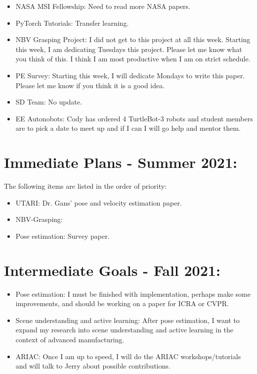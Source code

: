 \documentclass[11pt]{article}
\begin{document}
\begin{itemize}
      \item NASA MSI Fellowship: Need to read more NASA papers.
      \item PyTorch Tutorials: Transfer learning.
      \item NBV Grasping Project: I did not get to this project at all this week. Starting this week, I am dedicating Tuesdays this project. Please let me know what you think of this. I think I am most productive when I am on strict schedule.
      \item PE Survey: Starting this week, I will dedicate Mondays to write this paper. Please let me know if you think it is a good idea.
      \item SD Team: No update.
      \item EE Autonobots: Cody has ordered 4 TurtleBot-3 robots and student members are to pick a date to meet up and if I can I will go help and mentor them.
\end{itemize}


\section{Immediate Plans - Summer 2021:}
The following items are listed in the order of priority:

\begin{itemize}
      \item UTARI: Dr. Gans' pose and velocity estimation paper.
      \item NBV-Grasping:
      \item Pose estimation: Survey paper.
\end{itemize}

\section{Intermediate Goals - Fall 2021:}
\begin{itemize}
      \item Pose estimation: I must be finished with implementation, perhaps make some improvements, and should be working on a paper for ICRA or CVPR.
      \item Scene understanding and active learning: After pose estimation, I want to expand my research into scene understanding and active learning in the context of advanced manufacturing.
      \item ARIAC: Once I am up to speed, I will do the ARIAC workshops/tutorials and will talk to Jerry about possible contributions.
\end{itemize}


\newpage


\end{document}
